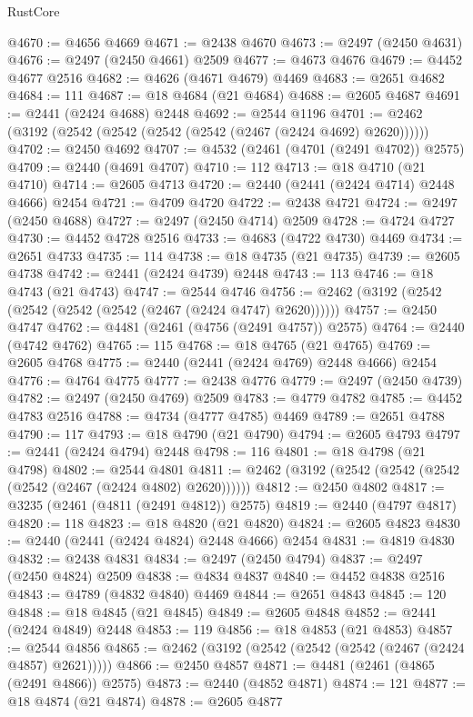 \begin{lexlean}{RustCore}
\begin{coremodule}
@4670 := @4656 @4669
@4671 := @2438 @4670
@4673 := @2497 (@2450 @4631)
@4676 := @2497 (@2450 @4661) @2509
@4677 := @4673 @4676
@4679 := @4452 @4677 @2516
@4682 := @4626 (@4671 @4679) @4469
@4683 := @2651 @4682
@4684 := 111
@4687 := @18 @4684 (@21 @4684)
@4688 := @2605 @4687
@4691 := @2441 (@2424 @4688) @2448
@4692 := @2544 @1196
@4701 := @2462 (@3192 (@2542 (@2542 (@2542 (@2542 (@2467 (@2424 @4692) @2620))))))
@4702 := @2450 @4692
@4707 := @4532 (@2461 (@4701 (@2491 @4702)) @2575)
@4709 := @2440 (@4691 @4707)
@4710 := 112
@4713 := @18 @4710 (@21 @4710)
@4714 := @2605 @4713
@4720 := @2440 (@2441 (@2424 @4714) @2448 @4666) @2454
@4721 := @4709 @4720
@4722 := @2438 @4721
@4724 := @2497 (@2450 @4688)
@4727 := @2497 (@2450 @4714) @2509
@4728 := @4724 @4727
@4730 := @4452 @4728 @2516
@4733 := @4683 (@4722 @4730) @4469
@4734 := @2651 @4733
@4735 := 114
@4738 := @18 @4735 (@21 @4735)
@4739 := @2605 @4738
@4742 := @2441 (@2424 @4739) @2448
@4743 := 113
@4746 := @18 @4743 (@21 @4743)
@4747 := @2544 @4746
@4756 := @2462 (@3192 (@2542 (@2542 (@2542 (@2542 (@2467 (@2424 @4747) @2620))))))
@4757 := @2450 @4747
@4762 := @4481 (@2461 (@4756 (@2491 @4757)) @2575)
@4764 := @2440 (@4742 @4762)
@4765 := 115
@4768 := @18 @4765 (@21 @4765)
@4769 := @2605 @4768
@4775 := @2440 (@2441 (@2424 @4769) @2448 @4666) @2454
@4776 := @4764 @4775
@4777 := @2438 @4776
@4779 := @2497 (@2450 @4739)
@4782 := @2497 (@2450 @4769) @2509
@4783 := @4779 @4782
@4785 := @4452 @4783 @2516
@4788 := @4734 (@4777 @4785) @4469
@4789 := @2651 @4788
@4790 := 117
@4793 := @18 @4790 (@21 @4790)
@4794 := @2605 @4793
@4797 := @2441 (@2424 @4794) @2448
@4798 := 116
@4801 := @18 @4798 (@21 @4798)
@4802 := @2544 @4801
@4811 := @2462 (@3192 (@2542 (@2542 (@2542 (@2542 (@2467 (@2424 @4802) @2620))))))
@4812 := @2450 @4802
@4817 := @3235 (@2461 (@4811 (@2491 @4812)) @2575)
@4819 := @2440 (@4797 @4817)
@4820 := 118
@4823 := @18 @4820 (@21 @4820)
@4824 := @2605 @4823
@4830 := @2440 (@2441 (@2424 @4824) @2448 @4666) @2454
@4831 := @4819 @4830
@4832 := @2438 @4831
@4834 := @2497 (@2450 @4794)
@4837 := @2497 (@2450 @4824) @2509
@4838 := @4834 @4837
@4840 := @4452 @4838 @2516
@4843 := @4789 (@4832 @4840) @4469
@4844 := @2651 @4843
@4845 := 120
@4848 := @18 @4845 (@21 @4845)
@4849 := @2605 @4848
@4852 := @2441 (@2424 @4849) @2448
@4853 := 119
@4856 := @18 @4853 (@21 @4853)
@4857 := @2544 @4856
@4865 := @2462 (@3192 (@2542 (@2542 (@2542 (@2467 (@2424 @4857) @2621)))))
@4866 := @2450 @4857
@4871 := @4481 (@2461 (@4865 (@2491 @4866)) @2575)
@4873 := @2440 (@4852 @4871)
@4874 := 121
@4877 := @18 @4874 (@21 @4874)
@4878 := @2605 @4877

\end{coremodule}
\end{lexlean}
